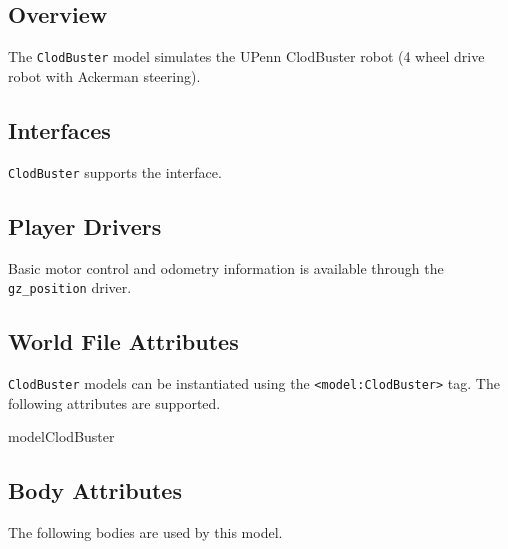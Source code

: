 
\subsection{Overview}

The {\tt ClodBuster} model simulates the UPenn ClodBuster robot (4 wheel
drive robot with Ackerman steering).

\subsection{\libgazebo Interfaces}

{\tt ClodBuster} supports the  interface.


\subsection{Player Drivers}

Basic motor control and odometry information is available through the
{\tt gz\_position} driver.


\subsection{World File Attributes}

{\tt ClodBuster} models can be instantiated using the
\verb+<model:ClodBuster>+ tag.  The following attributes are
supported.

\begin{xmlattrtable}{model}{ClodBuster}
\modeldefaults
{}
\end{xmlattrtable}

\subsection{Body Attributes}

The following bodies are used by this model.

\begin{bodyattrtable}
\bodydefaults
\end{bodyattrtable}
